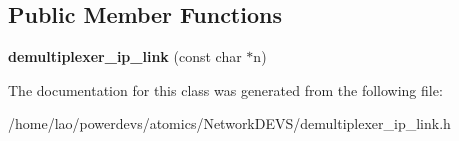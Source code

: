 \subsection*{Public Member Functions}
\begin{DoxyCompactItemize}
\item 
{\bfseries demultiplexer\+\_\+ip\+\_\+link} (const char $\ast$n)\hypertarget{classdemultiplexer__ip__link_aec9879ae23d1a8c51d7d73f9c8b3e2a5}{}\label{classdemultiplexer__ip__link_aec9879ae23d1a8c51d7d73f9c8b3e2a5}

\end{DoxyCompactItemize}


The documentation for this class was generated from the following file\+:\begin{DoxyCompactItemize}
\item 
/home/lao/powerdevs/atomics/\+Network\+D\+E\+V\+S/demultiplexer\+\_\+ip\+\_\+link.\+h\end{DoxyCompactItemize}
